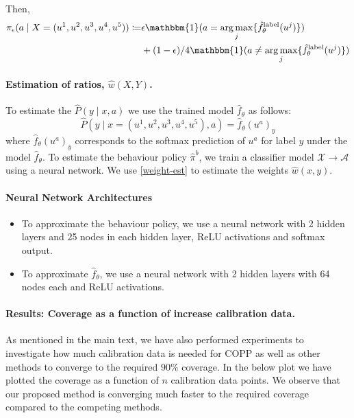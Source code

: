 Then,
\begin{align}
    \pi_\epsilon (a\mid X=(u^1, u^2,u^3,u^4,u^5)) \coloneqq& \epsilon \mathbbm{1}(a = \argmax_j\{ \hat{f}^{\textup{label}}_\theta(u^j) \}) \nonumber \\
    &+ (1-\epsilon)/4 \mathbbm{1}(a \neq \argmax_j\{ \hat{f}^{\textup{label}}_\theta(u^j) \}) \nonumber
\end{align}

\paragraph{Estimation of ratios, $\hat{w}(X, Y)$.}
To estimate the $\hat{P}(y \mid x, a)$ we use the trained model $\hat{f}_\theta$ as follows:
\[
\hat{P}(y \mid x = (u^1, u^2,u^3,u^4,u^5), a) = \hat{f}_\theta(u^a)_y
\]
where $\hat{f}_\theta(u^a)_y$ corresponds to the softmax prediction of $u^a$ for label $y$ under the model $\hat{f}_\theta$. To estimate the behaviour policy $\hat{\pi}^b$, we train a classifier model $\mathcal{X} \rightarrow \mathcal{A}$ using a neural network. We use \eqref{weight-est} to estimate the weights $\hat{w}(x, y)$.


\paragraph{Neural Network Architectures}
\begin{itemize}
    \item To approximate the behaviour policy, we use a neural network with 2 hidden layers and 25 nodes in each hidden layer, ReLU activations and softmax output.
    \item To approximate $\hat{f}_{\theta}$, we use a neural network with 2 hidden layers with 64 nodes each and ReLU activations.
\end{itemize}

\paragraph{Results: Coverage as a function of increase calibration data.}\label{app:N-cal_exp_msr}
As mentioned in the main text, we have also performed experiments to investigate how much calibration data is needed for COPP as well as other methods to converge to the required $90\%$ coverage. In the below plot we have plotted the coverage as a function of $n$ calibration data points. We observe that our proposed method is converging much faster to the required coverage compared to the competing methods.

